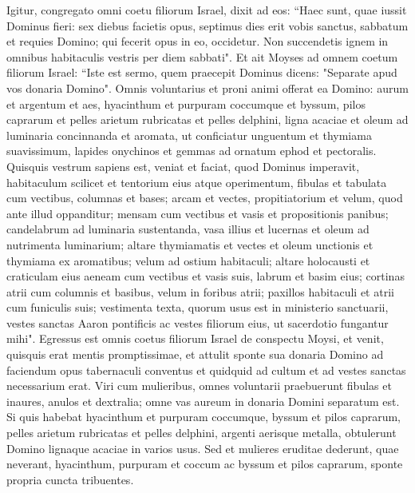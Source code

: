 \begin{biblechapter}  
\verse Igitur, congregato omni coetu filiorum Israel, dixit ad eos: “Haec sunt, quae iussit Dominus fieri: 
\verse sex diebus facietis opus, septimus dies erit vobis sanctus, sabbatum et requies Domino; qui fecerit opus in eo, occidetur.  
\verse Non succendetis ignem in omnibus habitaculis vestris per diem sabbati". 
\verse Et ait Moyses ad omnem coetum filiorum Israel: “Iste est sermo, quem praecepit Dominus dicens: 
\verse "Separate apud vos donaria Domino". Omnis voluntarius et proni animi offerat ea Domino: aurum et argentum et aes, 
\verse hyacinthum et purpuram coccumque et byssum, pilos caprarum 
\verse et pelles arietum rubricatas et pelles delphini, ligna acaciae 
\verse et oleum ad luminaria concinnanda et aromata, ut conficiatur unguentum et thymiama suavissimum, 
\verse lapides onychinos et gemmas ad ornatum ephod et pectoralis. 
\verse Quisquis vestrum sapiens est, veniat et faciat, quod Dominus imperavit,  
\verse habitaculum scilicet et tentorium eius atque operimentum, fibulas et tabulata cum vectibus, columnas et bases; 
\verse arcam et vectes, propitiatorium et velum, quod ante illud oppanditur; 
\verse mensam cum vectibus et vasis et propositionis panibus; 
\verse candelabrum ad luminaria sustentanda, vasa illius et lucernas et oleum ad nutrimenta luminarium; 
\verse altare thymiamatis et vectes et oleum unctionis et thymiama ex aromatibus; velum ad ostium habitaculi;  
\verse altare holocausti et craticulam eius aeneam cum vectibus et vasis suis, labrum et basim eius; 
\verse cortinas atrii cum columnis et basibus, velum in foribus atrii; 
\verse paxillos habitaculi et atrii cum funiculis suis; 
\verse vestimenta texta, quorum usus est in ministerio sanctuarii, vestes sanctas Aaron pontificis ac vestes filiorum eius, ut sacerdotio fungantur mihi". 
\verse Egressus est omnis coetus filiorum Israel de conspectu Moysi, 
\verse et venit, quisquis erat mentis promptissimae, et attulit sponte sua donaria Domino ad faciendum opus tabernaculi conventus et quidquid ad cultum et ad vestes sanctas necessarium erat. 
\verse Viri cum mulieribus, omnes voluntarii praebuerunt fibulas et inaures, anulos et dextralia; omne vas aureum in donaria Domini separatum est. 
\verse Si quis habebat hyacinthum et purpuram coccumque, byssum et pilos caprarum, pelles arietum rubricatas et pelles delphini, 
\verse argenti aerisque metalla, obtulerunt Domino lignaque acaciae in varios usus. 
\verse Sed et mulieres eruditae dederunt, quae neverant, hyacinthum, purpuram et coccum ac byssum 
\verse et pilos caprarum, sponte propria cuncta tribuentes.  

\end{biblechapter}
